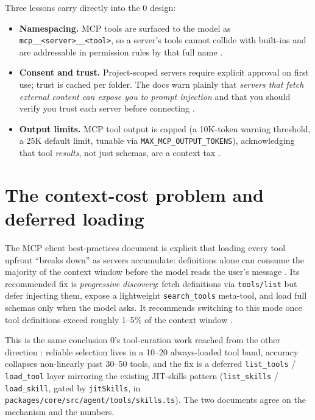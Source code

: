 \documentclass[11pt]{article}
\begin{document}
Three lessons carry directly into the 0 design:
\begin{itemize}[leftmargin=*]
  \item \textbf{Namespacing.} MCP tools are surfaced to the model as
  \texttt{mcp\_\_<server>\_\_<tool>}, so a server's tools cannot collide with
  built-ins and are addressable in permission rules by that full name
  \cite{claudecode-mcp}.
  \item \textbf{Consent and trust.} Project-scoped servers require explicit
  approval on first use; trust is cached per folder. The docs warn plainly that
  \emph{servers that fetch external content can expose you to prompt injection}
  and that you should verify you trust each server before connecting
  \cite{claudecode-mcp}.
  \item \textbf{Output limits.} MCP tool output is capped (a 10K-token warning
  threshold, a 25K default limit, tunable via \texttt{MAX\_MCP\_OUTPUT\_TOKENS}),
  acknowledging that tool \emph{results}, not just schemas, are a context tax
  \cite{claudecode-mcp}.
\end{itemize}

\section{The context-cost problem and deferred loading}

The MCP client best-practices document is explicit that loading every tool
upfront ``breaks down'' as servers accumulate: definitions alone can consume the
majority of the context window before the model reads the user's message
\cite{mcp-clientbp}. Its recommended fix is \emph{progressive discovery}: fetch
definitions via \texttt{tools/list} but defer injecting them, expose a
lightweight \texttt{search\_tools} meta-tool, and load full schemas only when the
model asks. It recommends switching to this mode once tool definitions exceed
roughly 1--5\% of the context window \cite{mcp-clientbp}.

This is the same conclusion 0's tool-curation work reached from the other
direction \cite{tool-curation}: reliable selection lives in a 10--20 always-loaded
tool band, accuracy collapses non-linearly past 30--50 tools, and the fix is a
deferred \texttt{list\_tools} / \texttt{load\_tool} layer mirroring the existing
JIT-skills pattern (\texttt{list\_skills} / \texttt{load\_skill}, gated by
\texttt{jitSkills}, in \texttt{packages/core/src/agent/tools/skills.ts}). The two
documents agree on the mechanism and the numbers.
\end{document}
